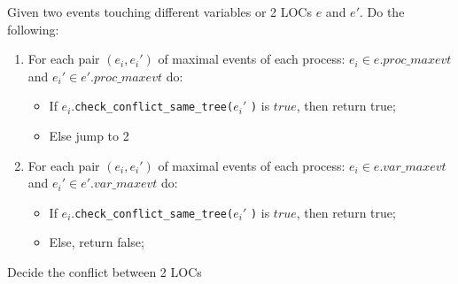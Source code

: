 \documentclass{llncs}
\begin{document}
\begin{algorithm}
Given two events touching different variables or 2 LOCs $e$ and $e'$.
Do the following:
\begin{enumerate}
	\item
		For each pair $(e_i, e_i')$ of maximal events of each process:
		$e_i \in e.proc\_maxevt$ and $e_i' \in e'.proc\_maxevt$ do: \\
		\begin{itemize}
			\item
				If $e_i$.\verb!check_conflict_same_tree(!$e_i'$ \verb!)! is $true$, then  return true;
			\item
				Else jump to 2
		\end{itemize}
			
	\item
		For each pair $(e_i, e_i')$ of maximal events of each process:
		$e_i \in e.var\_maxevt$ and $e_i' \in e'.var\_maxevt$ do:\\
			\begin{itemize}
			\item
				If $e_i$.\verb!check_conflict_same_tree(!$e_i'$ \verb!)! is $true$, then  return true;
			\item
				Else, return false;
		\end{itemize}
			
\end{enumerate}
\caption{Decide the conflict between 2 LOCs}
\label{a:reads}	
\end{algorithm}
\end{document}
